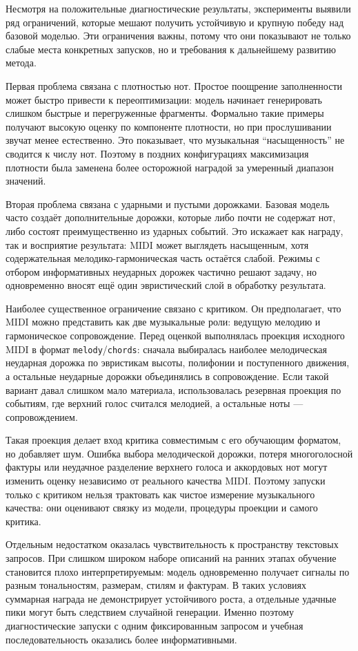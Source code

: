 \documentclass[a4paper,12pt]{extarticle}
\begin{document}
Несмотря на положительные диагностические результаты, эксперименты выявили
ряд ограничений, которые мешают получить устойчивую и крупную победу над
базовой моделью. Эти ограничения важны, потому что они показывают не только
слабые места конкретных запусков, но и требования к дальнейшему развитию
метода.

Первая проблема связана с плотностью нот. Простое поощрение заполненности
может быстро привести к переоптимизации: модель начинает генерировать слишком
быстрые и перегруженные фрагменты. Формально такие примеры получают высокую
оценку по компоненте плотности, но при прослушивании звучат менее естественно.
Это показывает, что музыкальная ``насыщенность'' не сводится к числу нот.
Поэтому в поздних конфигурациях максимизация плотности была заменена более
осторожной наградой за умеренный диапазон значений.

Вторая проблема связана с ударными и пустыми дорожками. Базовая модель часто
создаёт дополнительные дорожки, которые либо почти не содержат нот, либо
состоят преимущественно из ударных событий. Это искажает как награду, так и
восприятие результата: MIDI может выглядеть насыщенным, хотя содержательная
мелодико-гармоническая часть остаётся слабой. Режимы с отбором информативных
неударных дорожек частично решают задачу, но одновременно вносят ещё один
эвристический слой в обработку результата.

Наиболее существенное ограничение связано с критиком. Он предполагает, что
MIDI можно представить как две музыкальные роли: ведущую мелодию и
гармоническое сопровождение. Перед оценкой выполнялась проекция исходного MIDI
в формат \texttt{melody}/\texttt{chords}: сначала выбиралась наиболее
мелодическая неударная дорожка по эвристикам высоты, полифонии и поступенного
движения, а остальные неударные дорожки объединялись в сопровождение. Если
такой вариант давал слишком мало материала, использовалась резервная проекция
по событиям, где верхний голос считался мелодией, а остальные ноты ---
сопровождением.

Такая проекция делает вход критика совместимым с его обучающим форматом, но
добавляет шум. Ошибка выбора мелодической дорожки, потеря многоголосной
фактуры или неудачное разделение верхнего голоса и аккордовых нот могут
изменить оценку независимо от реального качества MIDI. Поэтому запуски только
с критиком нельзя трактовать как чистое измерение музыкального качества: они
оценивают связку из модели, процедуры проекции и самого критика.

Отдельным недостатком оказалась чувствительность к пространству текстовых
запросов. При слишком широком наборе описаний на ранних этапах обучение
становится плохо интерпретируемым: модель одновременно получает сигналы по
разным тональностям, размерам, стилям и фактурам. В таких условиях суммарная
награда не демонстрирует устойчивого роста, а отдельные удачные пики могут
быть следствием случайной генерации. Именно поэтому диагностические запуски с
одним фиксированным запросом и учебная последовательность оказались более
информативными.
\end{document}
